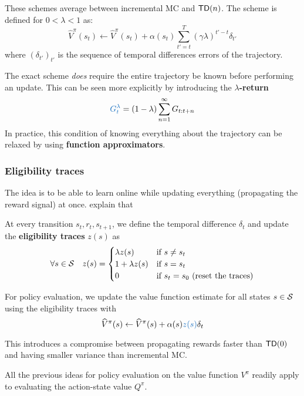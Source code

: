 \documentclass[../course-notes.tex]{subfiles}
\begin{document}
These schemes average between incremental MC and $\mathsf{TD}(n)$. The scheme is defined for $0 < \lambda < 1$ as:
\begin{equation}
	\widehat{V}^\pi(s_t) \leftarrow \widehat{V}^\pi(s_t) + \alpha(s_t) \sum_{t'=t}^T (\gamma\lambda)^{t'-t}\delta_{t'}
\end{equation}
where ${(\delta_{t'})}_{t'}$ is the sequence of temporal differences errors of the trajectory.

The exact scheme \textit{does} require the entire trajectory be known before performing an update. This can be seen more explicitly by introducing the \textbf{\boldmath $\lambda$-return}
\begin{equation}
	{\bluefont G_t^\lambda} = (1-\lambda)\sum_{n=1}^\infty G_{t:t+n}
\end{equation}
In practice, this condition of knowing everything about the trajectory can be relaxed by using \textbf{function approximators}.




\subsubsection{Eligibility traces}

The idea is to be able to learn online while updating everything (propagating the reward signal) at once. \textcite{Sutton1998} explain that 

At every transition $s_t,r_t,s_{t+1}$, we define the temporal difference $\delta_t$ and update the \textbf{\bluefont eligibility traces} {\bluefont $z(s)$} as
\[
	\forall s\in\mathcal{S} \quad 
	z(s) = \begin{cases}
	\lambda z(s) &\text{if }s\neq s_t \\
	1 + \lambda z(s)& \text{if }s=s_t \\
	0& \text{if } s_t = s_0 \text{ (reset the traces)}
	\end{cases}
\]

For policy evaluation, we update the value function estimate for all states $s\in\mathcal{S}$ using the eligibility traces with
\begin{equation}
	\widehat{V}^\pi(s) \leftarrow
	\widehat{V}^\pi(s) + \alpha(s){\bluefont z(s)}\delta_t
\end{equation}



This introduces a compromise between propagating rewards faster than $\mathsf{TD}(0)$ and having smaller variance than incremental MC.


\begin{remark}
	All the previous ideas for policy evaluation on the value function $V^\pi$ readily apply to evaluating the action-state value $Q^\pi$.
\end{remark}
\end{document}
